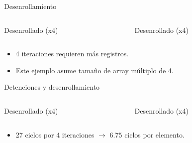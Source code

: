 \begin{frame}[t]{Desenrollamiento}

\begin{columns}

\begin{column}{.45\textwidth}
\begin{block}{Desenrollado (x4)}

\end{block}
\end{column}

\begin{column}{.45\textwidth}
\begin{block}{Desenrollado (x4)}

\end{block}
\end{column}

\end{columns}
\begin{itemize}
  \item 4 iteraciones requieren más registros.
  \item Este ejemplo asume tamaño de array múltiplo de 4.
\end{itemize}
\end{frame}

\begin{frame}[t,shrink=10]{Detenciones y desenrollamiento}

\begin{columns}[T]

\begin{column}{.45\textwidth}
\begin{block}{Desenrollado (x4)}

\end{block}
\end{column}

\begin{column}{.45\textwidth}
\begin{block}{Desenrollado (x4)}

\end{block}
\end{column}

\end{columns}
\begin{itemize}
  \item 27 ciclos por 4 iteraciones $\rightarrow$ $6.75$ ciclos por elemento.
\end{itemize}
\end{frame}

